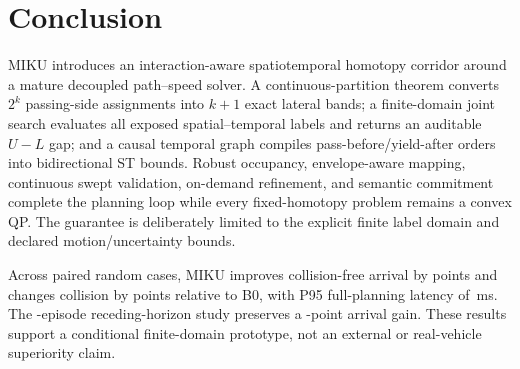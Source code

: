 \section{Conclusion}

MIKU introduces an interaction-aware spatiotemporal homotopy corridor around a mature decoupled path--speed solver. A continuous-partition theorem converts $2^k$ passing-side assignments into $k+1$ exact lateral bands; a finite-domain joint search evaluates all exposed spatial--temporal labels and returns an auditable $U-L$ gap; and a causal temporal graph compiles pass-before/yield-after orders into bidirectional ST bounds. Robust occupancy, envelope-aware mapping, continuous swept validation, on-demand refinement, and semantic commitment complete the planning loop while every fixed-homotopy problem remains a convex QP. The guarantee is deliberately limited to the explicit finite label domain and declared motion/uncertainty bounds.

Across \RandCaseCount{} paired random cases, MIKU improves collision-free arrival by \RandAllMikuVsBZeroSuccessDiff{} points and changes collision by \RandAllMikuVsBZeroCollisionDiff{} points relative to B0, with P95 full-planning latency of \RandAllMikuRuntimePninetyfive\,ms. The \ClosedCaseCount-episode receding-horizon study preserves a \ClosedMikuVsBZeroSuccessDiff-point arrival gain. These results support a conditional finite-domain prototype, not an external or real-vehicle superiority claim.
